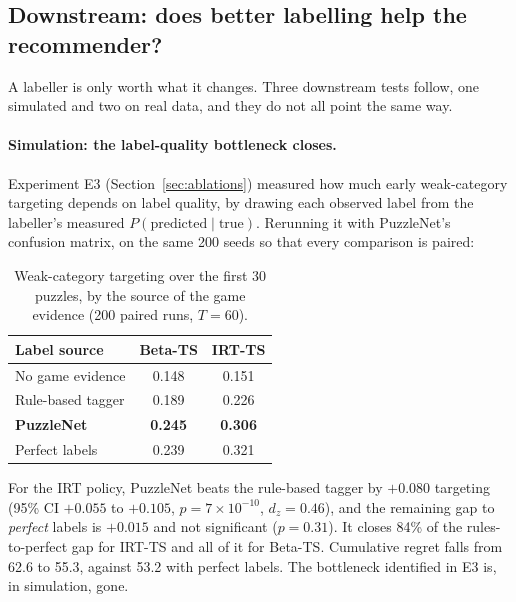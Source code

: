 \subsection{Downstream: does better labelling help the recommender?}\label{sec:nn-downstream}

A labeller is only worth what it changes. Three downstream tests follow, one simulated and two on real
data, and they do not all point the same way.

\paragraph{Simulation: the label-quality bottleneck closes.} Experiment E3
(Section~\ref{sec:ablations}) measured how much early weak-category targeting depends on label
quality, by drawing each observed label from the labeller's measured $P(\text{predicted} \mid
\text{true})$. Rerunning it with PuzzleNet's confusion matrix, on the same 200 seeds so that every
comparison is paired:

\begin{table}[H]
\centering
\small
\caption{Weak-category targeting over the first 30 puzzles, by the source of the game evidence
(200 paired runs, $T = 60$).}\label{tab:nn-labelsim}
\begin{tabularx}{\linewidth}{Xcc}
\toprule
\textbf{Label source} & \textbf{Beta-TS} & \textbf{IRT-TS} \\
\midrule
No game evidence              & 0.148 & 0.151 \\
Rule-based tagger             & 0.189 & 0.226 \\
\textbf{PuzzleNet}            & \textbf{0.245} & \textbf{0.306} \\
Perfect labels                & 0.239 & 0.321 \\
\bottomrule
\end{tabularx}
\end{table}

\begin{finding}
For the IRT policy, PuzzleNet beats the rule-based tagger by $+0.080$ targeting
(95\% CI $+0.055$ to $+0.105$, $p = 7 \times 10^{-10}$, $d_z = 0.46$), and the remaining gap to
\emph{perfect} labels is $+0.015$ and not significant ($p = 0.31$). It closes 84\% of the
rules-to-perfect gap for IRT-TS and all of it for Beta-TS. Cumulative regret falls from 62.6 to 55.3,
against 53.2 with perfect labels. The bottleneck identified in E3 is, in simulation, gone.
\end{finding}

